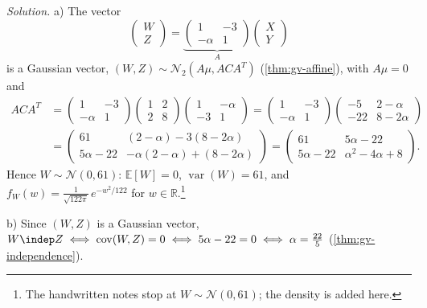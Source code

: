 \begin{example}
\emph{Solution.} a) The vector
\[
  \begin{pmatrix}W\\Z\end{pmatrix}=\underbrace{\begin{pmatrix}1&-3\\-\alpha&1\end{pmatrix}}_{A}\begin{pmatrix}X\\Y\end{pmatrix}
\]
is a Gaussian vector, $(W,Z)\sim\mathcal N_2(A\mu,ACA^T)$ (\cref{thm:gv-affine}), with $A\mu=0$ and
\[
\begin{aligned}
  ACA^T&=\begin{pmatrix}1&-3\\-\alpha&1\end{pmatrix}\begin{pmatrix}1&2\\2&8\end{pmatrix}\begin{pmatrix}1&-\alpha\\-3&1\end{pmatrix}
  =\begin{pmatrix}1&-3\\-\alpha&1\end{pmatrix}\begin{pmatrix}-5&2-\alpha\\-22&8-2\alpha\end{pmatrix}\\
  &=\begin{pmatrix}61&(2-\alpha)-3(8-2\alpha)\\5\alpha-22&-\alpha(2-\alpha)+(8-2\alpha)\end{pmatrix}
  =\begin{pmatrix}61&5\alpha-22\\5\alpha-22&\alpha^2-4\alpha+8\end{pmatrix}.
\end{aligned}
\]
Hence $W\sim\mathcal N(0,61)$: $\mathbb E[W]=0$, $\operatorname{var}(W)=61$, and
$f_W(w)=\frac1{\sqrt{122\pi}}\,e^{-w^2/122}$ for $w\in\mathbb R$.\footnote{The handwritten notes stop
at $W\sim\mathcal N(0,61)$; the density is added here.}

b) Since $(W,Z)$ is a Gaussian vector, $W\indep Z\iff\operatorname{cov}(W,Z)=0\iff5\alpha-22=0\iff\alpha=\frac{22}5$
(\cref{thm:gv-independence}).


\end{example}
